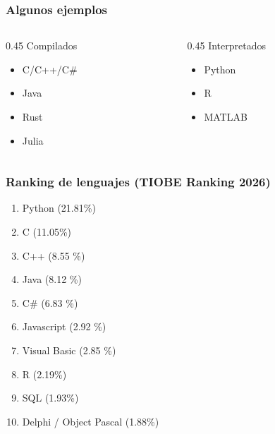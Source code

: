 \documentclass[14pt,aspectratio=169,xcolor=dvipsnames]{beamer}
\begin{document}
\begin{frame}\frametitle{Algunos ejemplos}
    \begin{columns}
        \begin{column}{0.45\textwidth}
            Compilados
            \begin{itemize}
                \item C/C++/C\#
                \item Java
                \item Rust
                \item Julia
            \end{itemize}
        \end{column}

        \begin{column}{0.45\textwidth}
            Interpretados
            \begin{itemize}
                \item Python
                \item R
                \item MATLAB
            \end{itemize}
        \end{column}
    \end{columns}
\end{frame}
\begin{frame}\frametitle{Ranking de lenguajes (TIOBE Ranking 2026)}
    \begin{enumerate}
        \item Python  (21.81\%)
        \item C  (11.05\%)
        \item C++ (8.55 \%)
        \item Java (8.12 \%)
        \item C\# (6.83 \%)
        \item Javascript (2.92 \%)
        \item Visual Basic (2.85 \%)
        \item R (2.19\%)
        \item SQL (1.93\%)
        \item Delphi / Object Pascal (1.88\%)
    \end{enumerate}
\end{frame}
\end{document}

